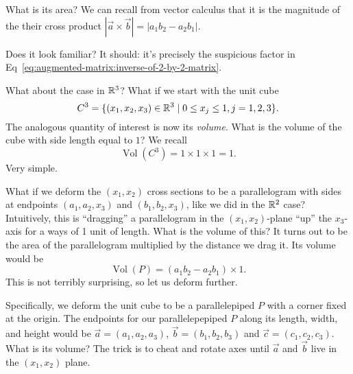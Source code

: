 What is its area? We can recall from vector
calculus that it is the magnitude of the their cross product
$|\vec{a}\times\vec{b}|=|a_{1}b_{2}-a_{2}b_{1}|$.

Does it look familiar? It should: it's precisely the suspicious factor
in Eq~\eqref{eq:augmented-matrix:inverse-of-2-by-2-matrix}.

\M What about the case in $\mathbb{R}^{3}$? What if we start with the unit cube
\begin{equation}
C^{3} = \{(x_{1},x_{2},x_{3})\in\mathbb{R}^{3}\mid 0\leq x_{j}\leq 1, j=1,2,3\}.
\end{equation}
The analogous quantity of interest is now its \emph{volume}. What is the
volume of the cube with side length equal to $1$? We recall
\begin{equation}
\operatorname{Vol}(C^{3})=1\times1\times1=1.
\end{equation}
Very simple.

What if we deform the $(x_{1},x_{2})$ cross sections to be a
parallelogram with sides at endpoints $(a_{1},a_{2},x_{3})$ and
$(b_{1},b_{2},x_{3})$, like we did in the $\mathbb{R}^{2}$ case? Intuitively, this is
``dragging'' a parallelogram in the $(x_{1},x_{2})$-plane ``up'' the
$x_{3}$-axis for a ways of 1 unit of length. What is the volume of this?
It turns out to be the area of the parallelogram multiplied by the
distance we drag it. Its volume would be
\begin{equation}
\operatorname{Vol}(P) = (a_{1}b_{2}-a_{2}b_{1})\times 1.
\end{equation}
This is not terribly surprising, so let us deform further.

Specifically, we deform the unit cube to be a parallelepiped $P$ with a
corner fixed at the origin. The endpoints for our parallelepepiped $P$ along
its length, width, and height would be $\vec{a}=(a_{1},a_{2},a_{3})$,
$\vec{b}=(b_{1},b_{2},b_{3})$ and $\vec{c}=(c_{1},c_{2},c_{3})$. What is
its volume? The trick is to cheat and rotate axes until $\vec{a}$ and
$\vec{b}$ live in the $(x_{1},x_{2})$ plane.

